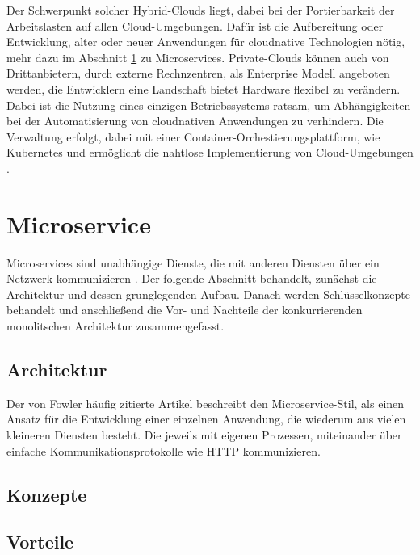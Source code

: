 Der Schwerpunkt solcher Hybrid-Clouds liegt, dabei bei der Portierbarkeit der Arbeitslasten auf allen Cloud-Umgebungen.
Dafür ist die Aufbereitung oder Entwicklung, alter oder neuer Anwendungen für cloudnative Technologien nötig, mehr dazu im Abschnitt \ref{Microservice} zu Microservices.
Private-Clouds können auch von Drittanbietern, durch externe Rechnzentren, als Enterprise Modell angeboten werden, die Entwicklern eine Landschaft bietet
Hardware flexibel zu verändern. Dabei ist die Nutzung eines einzigen Betriebssystems ratsam, um Abhängigkeiten bei der Automatisierung von cloudnativen Anwendungen zu verhindern.
Die Verwaltung erfolgt, dabei mit einer Container-Orchestierungsplattform, wie Kubernetes und ermöglicht die nahtlose Implementierung von Cloud-Umgebungen \cite{ibmHybrid}.

\section{Microservice}\label{Microservice}
Microservices sind unabhängige Dienste, die mit anderen Diensten über ein Netzwerk kommunizieren \cite{BuildingMicroservicesNewman}.
Der folgende Abschnitt behandelt, zunächst die Architektur und dessen grunglegenden Aufbau.
Danach werden Schlüsselkonzepte behandelt und anschließend die Vor- und Nachteile der konkurrierenden monolitschen Architektur zusammengefasst.


\subsection{Architektur}
Der von Fowler häufig zitierte Artikel beschreibt den Microservice-Stil, als einen Ansatz für die Entwicklung einer einzelnen Anwendung, die wiederum aus vielen kleineren Diensten besteht.
Die jeweils mit eigenen Prozessen, miteinander über einfache Kommunikationsprotokolle wie HTTP kommunizieren.



\subsection{Konzepte}
\subsection{Vorteile}


